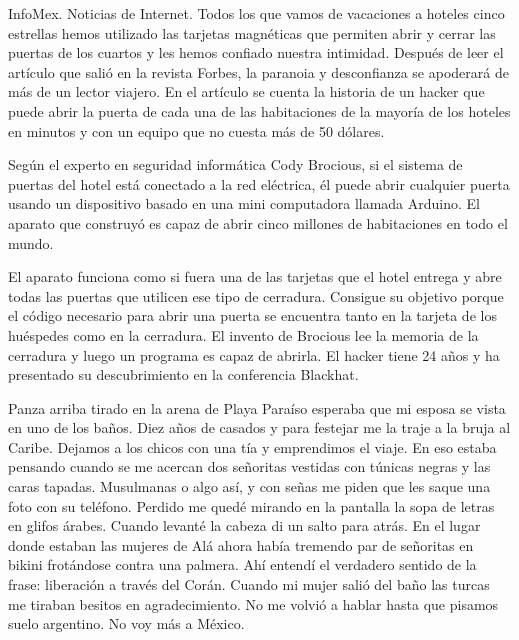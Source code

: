 \documentclass[12pt,twoside,openright,a5paper]{book}
\begin{document}
\vspace{0.5cm}
\hrulefill\hspace{0.2cm} \decofourleft\decofourright \hspace{0.2cm} \hrulefill
\vspace{0.5cm}

InfoMex. Noticias de Internet. Todos los que vamos de vacaciones a hoteles
cinco estrellas hemos utilizado las tarjetas magnéticas que permiten
abrir y cerrar las puertas de los cuartos y les hemos confiado nuestra
intimidad. Después de leer el artículo que salió en la revista Forbes,
la paranoia y desconfianza se apoderará de más de un lector viajero. En
el artículo se cuenta la historia de un hacker que puede abrir la puerta
de cada una de las habitaciones de la mayoría de los hoteles en minutos
y con un equipo que no cuesta más de 50 dólares.

Según el experto en seguridad informática Cody Brocious, si el sistema
de puertas del hotel está conectado a la red eléctrica, él puede abrir
cualquier puerta usando un dispositivo basado en una mini computadora llamada
Arduino. El aparato que construyó es capaz de abrir cinco millones de
habitaciones en todo el mundo.

El aparato funciona como si fuera una de las tarjetas que el hotel entrega
y abre todas las puertas que utilicen ese tipo de cerradura. Consigue su
objetivo porque el código necesario para abrir una puerta se encuentra
tanto en la tarjeta de los huéspedes como en la cerradura. El invento de
Brocious lee la memoria de la cerradura y luego un programa es capaz de
abrirla. El hacker tiene 24 años y ha presentado su descubrimiento en la
conferencia Blackhat.


\vspace{0.5cm}
\hrulefill\hspace{0.2cm} \decofourleft\decofourright \hspace{0.2cm} \hrulefill
\vspace{0.5cm}

Panza arriba tirado en la arena de Playa Paraíso esperaba que mi esposa se
vista en uno de los baños. Diez años de casados y para festejar me la traje
a la bruja al Caribe. Dejamos a los chicos con una tía y emprendimos el
viaje. En eso estaba pensando cuando se me acercan dos señoritas vestidas
con túnicas negras y las caras tapadas. Musulmanas o algo así, y con
señas me piden que les saque una foto con su teléfono. Perdido me quedé
mirando en la pantalla la sopa de letras en glifos árabes. Cuando levanté
la cabeza di un salto para atrás. En el lugar donde estaban las mujeres de
Alá ahora había tremendo par de señoritas en bikini frotándose contra
una palmera. Ahí entendí el verdadero sentido de la frase: liberación a
través del Corán. Cuando mi mujer salió del baño las turcas me tiraban
besitos en agradecimiento. No me volvió a hablar hasta que pisamos suelo
argentino. No voy más a México.
\end{document}
